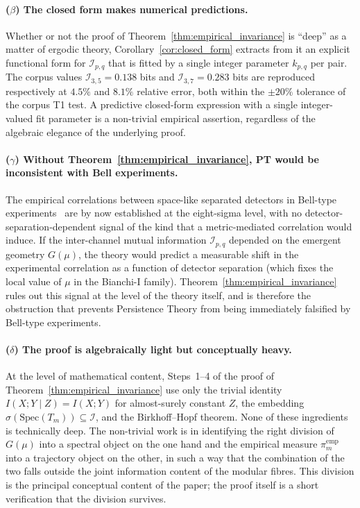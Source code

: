 \paragraph{($\beta$) The closed form makes numerical predictions.}
Whether or not the proof of
Theorem~\ref{thm:empirical_invariance} is ``deep'' as a matter of
ergodic theory, Corollary~\ref{cor:closed_form} extracts from it
an explicit functional form for $\mathcal{I}_{p,q}$ that is fitted
by a single integer parameter $k_{p,q}$ per pair. The corpus
values $\mathcal{I}_{3,5} = 0.138$ bits and
$\mathcal{I}_{3,7} = 0.283$ bits are reproduced respectively at
$4.5\%$ and $8.1\%$ relative error, both within the
$\pm 20\%$ tolerance of the corpus T1 test. A predictive
closed-form expression with a single integer-valued fit parameter
is a non-trivial empirical assertion, regardless of the algebraic
elegance of the underlying proof.

\paragraph{($\gamma$) Without
Theorem~\ref{thm:empirical_invariance}, PT would be inconsistent
with Bell experiments.}
The empirical correlations between space-like separated detectors
in Bell-type experiments~\cite{Bell1964,AspectGrangier1982,Hensen2015}
are by now established at the eight-sigma level, with no
detector-separation-dependent signal of the kind that a
metric-mediated correlation would induce. If the inter-channel
mutual information $\mathcal{I}_{p,q}$ depended on the emergent
geometry $G(\mu)$, the theory would predict a measurable shift in
the experimental correlation as a function of detector separation
(which fixes the local value of $\mu$ in the Bianchi-I family).
Theorem~\ref{thm:empirical_invariance} rules out this signal at
the level of the theory itself, and is therefore the obstruction
that prevents Persistence Theory from being immediately falsified
by Bell-type experiments.

\paragraph{($\delta$) The proof is algebraically light but
conceptually heavy.}
At the level of mathematical content, Steps~1--4 of the proof of
Theorem~\ref{thm:empirical_invariance} use only the trivial
identity $I(X; Y \mid Z) = I(X; Y)$ for almost-surely constant
$Z$, the embedding $\sigma(\mathrm{Spec}(T_m)) \subseteq
\mathcal{I}$, and the Birkhoff--Hopf theorem. None of these
ingredients is technically deep. The non-trivial work is in
identifying the right division of $G(\mu)$ into a spectral object
on the one hand and the empirical measure $\pi_m^{\mathrm{emp}}$
into a trajectory object on the other, in such a way that the
combination of the two falls outside the joint information content
of the modular fibres. This division is the principal conceptual
content of the paper; the proof itself is a short verification
that the division survives.

